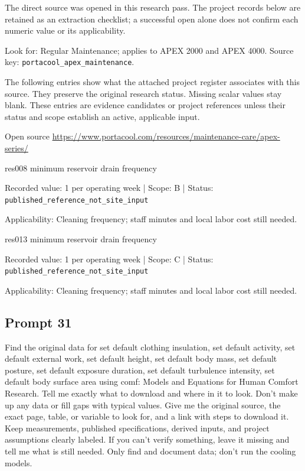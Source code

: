 The direct source was opened in this research pass. The project records below are retained as an extraction checklist; a successful open alone does not confirm each numeric value or its applicability.

Look for: Regular Maintenance; applies to APEX 2000 and APEX 4000. Source key: \nolinkurl{portacool_apex_maintenance}.

The following entries show what the attached project register associates with this source. They preserve the original research status. Missing scalar values stay blank. These entries are evidence candidates or project references unless their status and scope establish an active, applicable input.

Open source  \url{https://www.portacool.com/resources/maintenance-care/apex-series/}

res008  minimum reservoir drain frequency

Recorded value: 1 per operating week | Scope: B | Status: \nolinkurl{published_reference_not_site_input}

Applicability: Cleaning frequency; staff minutes and local labor cost still needed.

res013  minimum reservoir drain frequency

Recorded value: 1 per operating week | Scope: C | Status: \nolinkurl{published_reference_not_site_input}

Applicability: Cleaning frequency; staff minutes and local labor cost still needed.

\subsection*{Prompt 31}
Find the original data for set default clothing insulation, set default activity, set default external work, set default height, set default body mass, set default posture, set default exposure duration, set default turbulence intensity, set default body surface area using comf: Models and Equations for Human Comfort Research. Tell me exactly what to download and where in it to look. Don’t make up any data or fill gaps with typical values. Give me the original source, the exact page, table, or variable to look for, and a link with steps to download it. Keep measurements, published specifications, derived inputs, and project assumptions clearly labeled. If you can’t verify something, leave it missing and tell me what is still needed. Only find and document data; don’t run the cooling models.

